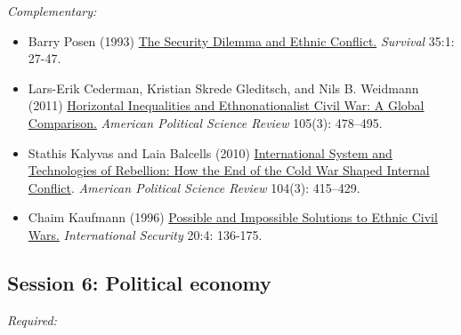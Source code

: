 \documentclass[12pt, a4paper]{article}
\begin{document}
\noindent\textit{Complementary:}

\begin{itemize}
  \item Barry Posen (1993) \href{https://doi.org/10.1080/00396339308442672}{The Security Dilemma and Ethnic Conflict.} \textit{Survival} 35:1: 27-47.
  \item Lars-Erik Cederman, Kristian Skrede Gleditsch, and Nils B. Weidmann (2011) \href{https://doi.org/10.1017/S0003055411000207}{Horizontal Inequalities and Ethnonationalist Civil War: A Global Comparison.} \textit{American Political Science Review} 105(3): 478--495.
  \item Stathis Kalyvas and Laia Balcells (2010) \href{https://doi.org/10.1017/S0003055410000286}{International System and Technologies of Rebellion: How the End of the Cold War Shaped Internal Conflict}. \textit{American Political Science Review} 104(3): 415--429.
	\item Chaim Kaufmann (1996) \href{https://doi.org/10.1162/isec.20.4.136}{Possible and Impossible Solutions to Ethnic Civil Wars.} \textit{International Security} 20:4: 136-175.
\end{itemize}


\vspace{20pt}
\hline
\subsection*{Session 6: Political economy}

\noindent\textit{Required:}
\end{document}

